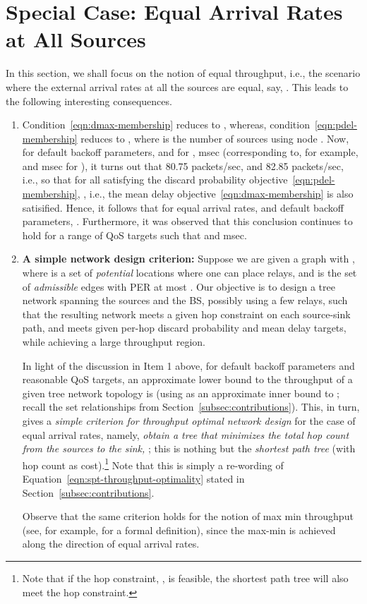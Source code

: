 \documentclass[12pt, draftclsnofoot, onecolumn]{IEEEtran}
\begin{document}
\section{Special Case: Equal Arrival Rates at All Sources}
\label{sec:equal-arrival-rates}

In this section, we shall focus on the notion of equal throughput, i.e., the scenario where the external arrival rates at all the sources are equal, say, . This leads to the following interesting consequences. 

\begin{enumerate}
\item Condition~\eqref{eqn:dmax-membership} reduces to , whereas, condition~\eqref{eqn:pdel-membership} reduces to , where  is the number of sources using node . 
Now, for default backoff parameters, and for ,  msec (corresponding to, for example,  and  msec for ), it turns out that   80.75 packets/sec, and  82.85 packets/sec, i.e.,  so that for all  satisfying the discard probability objective~\eqref{eqn:pdel-membership}, , i.e., the mean delay objective~\eqref{eqn:dmax-membership} is also satisified. Hence, it follows that for equal arrival rates, and default backoff parameters, . Furthermore, it was observed that this conclusion continues to hold for a range of QoS targets such that  and  msec.

\item \textbf{A simple network design criterion:} Suppose we are given a graph  with , where  is a set of \emph{potential} locations where one can place relays, and  is the set of \emph{admissible} edges with PER at most . Our objective is to design a tree network spanning the sources and the BS, possibly using a few relays, such that the resulting network meets a given hop constraint  on each source-sink path, and meets given per-hop discard probability and mean delay targets, while achieving a large throughput region. 

In light of the discussion in Item 1 above, for default backoff parameters and reasonable QoS targets, an approximate lower bound to the throughput of a given tree network topology is  (using  as an approximate inner bound to ; recall the set relationships from Section~\ref{subsec:contributions}). This, in turn, gives a \emph{simple criterion for throughput optimal network design} for the case of equal arrival rates, namely, \emph{obtain a tree that minimizes the total hop count from the sources to the sink, }; this is nothing but the \emph{shortest path tree} (with hop count as cost).\footnote{Note that if the hop constraint, , is feasible, the shortest path tree will also meet the hop constraint.} Note that this is simply a re-wording of Equation~\eqref{eqn:spt-throughput-optimality} stated in Section~\ref{subsec:contributions}.

Observe that the same criterion holds for the notion of max min throughput (see, for example, \cite{bhattacharya-kumar14tr-qos-aware-nw-design-csma} for a formal definition), since the max-min is achieved along the direction of equal arrival rates. 
\end{enumerate}
\end{document}

